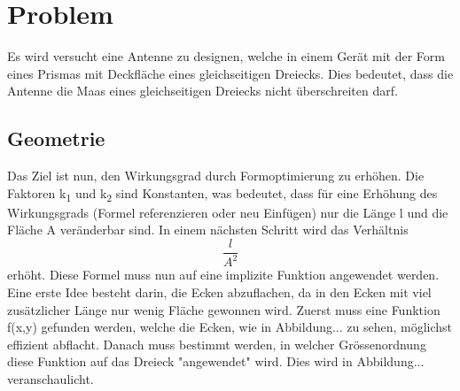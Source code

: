%
%
% 
%
%

\section{Problem\label{antennen:problemstellung}}
 Es wird versucht eine Antenne zu designen, welche in einem Gerät mit der Form eines Prismas mit Deckfläche eines gleichseitigen Dreiecks. Dies bedeutet, dass die Antenne die Maas eines gleichseitigen Dreiecks nicht überschreiten darf.
\subsection{Geometrie\label{antennen:Geom}}
Das Ziel ist nun, den Wirkungsgrad durch Formoptimierung zu erhöhen. Die Faktoren k\textsubscript{1} und k\textsubscript{2} sind Konstanten, was bedeutet, dass für eine Erhöhung des Wirkungsgrads (Formel referenzieren oder neu Einfügen) nur die Länge l und die Fläche A veränderbar sind. In einem nächsten Schritt wird das Verhältnis
\begin{equation}
	\frac{l}{A^2}
	\label{antennen:Verhältnis}
\end{equation}
erhöht. Diese Formel muss nun auf eine implizite Funktion angewendet werden. Eine erste Idee besteht darin, die Ecken abzuflachen, da in den Ecken mit viel zusätzlicher Länge nur wenig Fläche gewonnen wird. Zuerst muss eine Funktion f(x,y) gefunden werden, welche die Ecken, wie in Abbildung... zu sehen, möglichst effizient abflacht. Danach muss bestimmt werden, in welcher Grössenordnung diese Funktion auf das Dreieck "angewendet" wird. Dies wird in Abbildung... veranschaulicht.